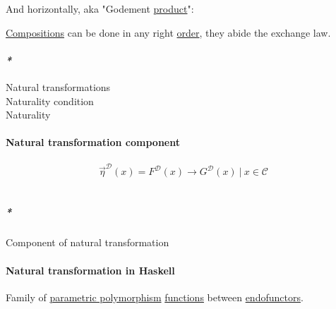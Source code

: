 \documentclass[11pt]{article}
\begin{document}

And horizontally, aka "Godement \hyperref[org80a0b6e]{product}":\\



\hyperref[org89b4de0]{Compositions} can be done in any right \hyperref[orgc0a359b]{order}, they abide the exchange law.\\

\paragraph{\emph{*}}
\label{sec:org754b081}

\label{org5148d4c}Natural transformations\\
\label{orge0f2eef}Naturality condition\\
\label{orgf952d87}Naturality\\

\paragraph{\label{org716c3c1}Natural transformation component}
\label{sec:orgc6ef31a}
$$ \overrightarrow{\eta}^{\mathcal{D}}(x) = F^{\mathcal{D}}(x) \to G^{\mathcal{D}}(x) \ | \  x \in \mathcal{C} $$\\

\subparagraph{\emph{*}}
\label{sec:org9616452}

\label{org5b2c5ef}Component of natural transformation\\

\paragraph{\label{orgbae1394}Natural transformation in Haskell}
\label{sec:orgb9aafec}
Family of \hyperref[org3c0b242]{parametric polymorphism} \hyperref[orgaa8fb87]{functions} between \hyperref[orgfcca64a]{endofunctors}.\\
\end{document}
